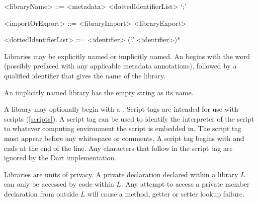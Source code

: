 \documentclass[makeidx]{article}
\begin{document}
{\begin{grammar}
<libraryName> ::= <metadata> \LIBRARY{} <dottedIdentifierList> `;'

<importOrExport> ::= <libraryImport>
  \alt <libraryExport>

<dottedIdentifierList> ::= <identifier> (`.' <identifier>)*
\end{grammar}

\LMHash{}%
Libraries may be explicitly named or implicitly named.
An  begins with the word \LIBRARY{} (possibly prefaced with any applicable metadata annotations), followed by a qualified identifier that gives the name of the library.


\LMHash{}%
An implicitly named library has the empty string as its name.



\LMHash{}%
A library may optionally begin with a .
Script tags are intended for use with scripts (\ref{scripts}).
A script tag can be used to identify the interpreter of the script to whatever computing environment the script is embedded in.
The script tag must appear before any whitespace or comments.
A script tag begins with  and ends at the end of the line.
Any characters that follow  in the script tag are ignored by the Dart implementation.

\LMHash{}%
Libraries are units of privacy.
A private declaration declared within a library $L$ can only be accessed by code within $L$.
Any attempt to access a private member declaration from outside $L$ will cause a method, getter or setter lookup failure.


}
\end{document}
